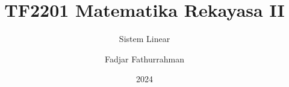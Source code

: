 

\title{TF2201 Matematika Rekayasa II}
\subtitle{Sistem Linear}
\author{Fadjar Fathurrahman}
\date{2024}



\frame{\titlepage}




